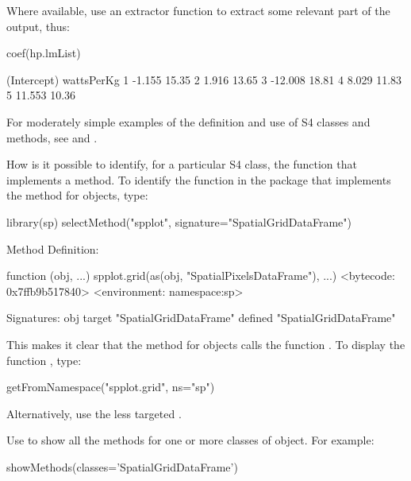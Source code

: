 Where available, use an extractor function to extract some relevant
part of the output, thus:
\begin{Schunk}
\begin{Sinput}
coef(hp.lmList)
\end{Sinput}
\begin{Soutput}
  (Intercept) wattsPerKg
1      -1.155      15.35
2       1.916      13.65
3     -12.008      18.81
4       8.029      11.83
5      11.553      10.36
\end{Soutput}
\end{Schunk}

For moderately simple examples of the definition and use of S4 classes
and methods, see  and .

How is it possible to identify, for a particular S4 class, the
function that implements a method.  To identify the function
in the  package that implements the  method
for  objects, type:
\begin{Schunk}
\begin{Sinput}
library(sp)
selectMethod("spplot",
             signature="SpatialGridDataFrame")
\end{Sinput}
\begin{Soutput}
Method Definition:

function (obj, ...) 
spplot.grid(as(obj, "SpatialPixelsDataFrame"), ...)
<bytecode: 0x7ffb9b517840>
<environment: namespace:sp>

Signatures:
        obj                   
target  "SpatialGridDataFrame"
defined "SpatialGridDataFrame"
\end{Soutput}
\end{Schunk}
This makes it clear that the  method for
 objects calls the function
. To display the function ,
type:
\begin{Schunk}
\begin{Sinput}
getFromNamespace("spplot.grid", ns="sp")
\end{Sinput}
\end{Schunk}
\noindent
Alternatively, use the less targeted
.

Use  to show all the methods for one or more
classes of object.  For example:
\begin{Schunk}
\begin{Sinput}
showMethods(classes='SpatialGridDataFrame')
\end{Sinput}
\end{Schunk}

